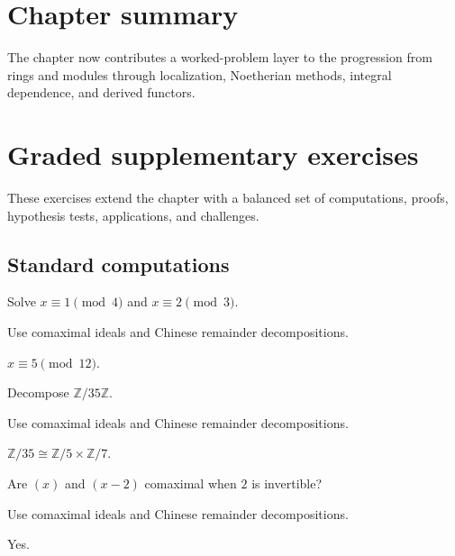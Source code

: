 \section*{Chapter summary}
The chapter now contributes a worked-problem layer to the progression from rings and modules through localization, Noetherian methods, integral dependence, and derived functors.
\section{Graded supplementary exercises}
These exercises extend the chapter with a balanced set of computations, proofs, hypothesis tests, applications, and challenges.

\subsection*{Standard computations}

\begin{exercise}\label{exr:v04-expand-01}
Solve $x\equiv1\pmod4$ and $x\equiv2\pmod3$.
\end{exercise}
\begin{hint}
Use comaximal ideals and Chinese remainder decompositions.
\end{hint}
\begin{solution}
$x\equiv5\pmod{12}$.
\end{solution}

\begin{exercise}\label{exr:v04-expand-02}
Decompose $\mathbb Z/35\mathbb Z$.
\end{exercise}
\begin{hint}
Use comaximal ideals and Chinese remainder decompositions.
\end{hint}
\begin{solution}
$\mathbb Z/35\cong\mathbb Z/5\times\mathbb Z/7$.
\end{solution}

\begin{exercise}[Comaximality]\label{exr:v04-expand-03}
Are $(x)$ and $(x-2)$ comaximal when $2$ is invertible?
\end{exercise}
\begin{hint}
Use comaximal ideals and Chinese remainder decompositions.
\end{hint}
\begin{solution}
Yes.
\end{solution}

